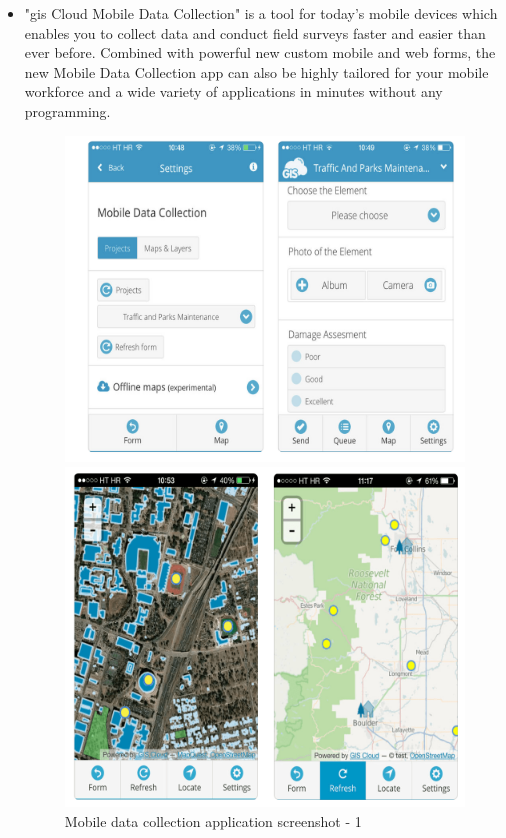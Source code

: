 \begin{itemize}
  \item "\gls{gis} Cloud Mobile Data Collection" is a tool for today’s mobile devices which enables you to collect data and conduct field surveys faster and easier than ever before. Combined with powerful new custom mobile and web forms, the new Mobile Data Collection app can also be highly tailored for your mobile workforce and a wide variety of applications in minutes without any programming. \cite{GIS_cloud_mobile_data_collection}
 
  
  \begin{figure}[!htb]
        \begin{minipage}{0.35\textwidth}
            \centering
            \includegraphics[width=1.0\linewidth]{figures/ch1/mobile_data_collection_1.png}
            \caption{Mobile data collection application screenshot - 1 \cite{GIS_cloud_mobile_data_collection}}\label{Fig:mobile_data_collection_1}
        \end{minipage}\hfill
        \begin{minipage}{0.35\textwidth}
            \centering
            \includegraphics[width=1.0\linewidth]{figures/ch1/mobile_data_collection_2.png}

\end{minipage}
\end{figure}
\end{itemize}
